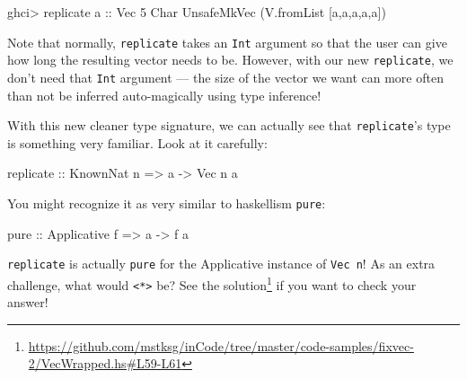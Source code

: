 \documentclass[]{article}
\newenvironment{Shaded}{}{}
\newcommand{\CharTok}[1]{\textcolor[rgb]{0.25,0.44,0.63}{#1}}
\newcommand{\DataTypeTok}[1]{\textcolor[rgb]{0.56,0.13,0.00}{#1}}
\newcommand{\DecValTok}[1]{\textcolor[rgb]{0.25,0.63,0.44}{#1}}
\newcommand{\FunctionTok}[1]{\textcolor[rgb]{0.02,0.16,0.49}{#1}}
\newcommand{\NormalTok}[1]{#1}
\newcommand{\OperatorTok}[1]{\textcolor[rgb]{0.40,0.40,0.40}{#1}}
\newcommand{\OtherTok}[1]{\textcolor[rgb]{0.00,0.44,0.13}{#1}}
\renewcommand{\href}[2]{#2\footnote{\url{#1}}}
\begin{document}
\begin{Shaded}
\begin{Highlighting}[]
\NormalTok{ghci}\OperatorTok{\textgreater{}} \FunctionTok{replicate} \CharTok{\textquotesingle{}a\textquotesingle{}}\OtherTok{ ::} \DataTypeTok{Vec} \DecValTok{5} \DataTypeTok{Char}
\DataTypeTok{UnsafeMkVec}\NormalTok{ (V.fromList [}\CharTok{\textquotesingle{}a\textquotesingle{}}\NormalTok{,}\CharTok{\textquotesingle{}a\textquotesingle{}}\NormalTok{,}\CharTok{\textquotesingle{}a\textquotesingle{}}\NormalTok{,}\CharTok{\textquotesingle{}a\textquotesingle{}}\NormalTok{,}\CharTok{\textquotesingle{}a\textquotesingle{}}\NormalTok{])}
\end{Highlighting}
\end{Shaded}

Note that normally, \texttt{replicate} takes an \texttt{Int} argument so that
the user can give how long the resulting vector needs to be. However, with our
new \texttt{replicate}, we don't need that \texttt{Int} argument --- the size of
the vector we want can more often than not be inferred auto-magically using type
inference!

With this new cleaner type signature, we can actually see that
\texttt{replicate}'s type is something very familiar. Look at it carefully:

\begin{Shaded}
\begin{Highlighting}[]
\FunctionTok{replicate}\OtherTok{ ::} \DataTypeTok{KnownNat}\NormalTok{ n }\OtherTok{=\textgreater{}}\NormalTok{ a }\OtherTok{{-}\textgreater{}} \DataTypeTok{Vec}\NormalTok{ n a}
\end{Highlighting}
\end{Shaded}

You might recognize it as very similar to haskellism \texttt{pure}:

\begin{Shaded}
\begin{Highlighting}[]
\FunctionTok{pure}\OtherTok{ ::} \DataTypeTok{Applicative}\NormalTok{ f }\OtherTok{=\textgreater{}}\NormalTok{ a }\OtherTok{{-}\textgreater{}}\NormalTok{ f a}
\end{Highlighting}
\end{Shaded}

\texttt{replicate} is actually \texttt{pure} for the Applicative instance of
\texttt{Vec\ n}! As an extra challenge, what would
\texttt{\textless{}*\textgreater{}} be? See
\href{https://github.com/mstksg/inCode/tree/master/code-samples/fixvec-2/VecWrapped.hs\#L59-L61}{the
solution} if you want to check your answer!
\end{document}
